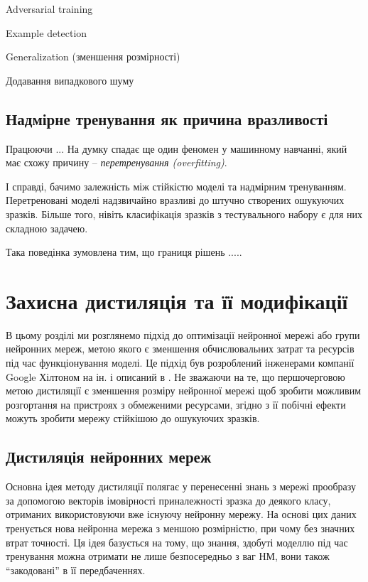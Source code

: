 \documentclass[14pt,a4paper]{extarticle}
\newcounter{e}
\numberwithin{equation}{section}
\numberwithin{figure}{section}
\begin{document}
 Adversarial training
 
 Example detection
 
 Generalization (зменшення розмірності)
 
 
 Додавання випадкового шуму
 
  
 \subsection{Надмірне тренування як причина вразливості}
 
 Працюючи ...
 На думку спадає ще один феномен у машинному навчанні, який має схожу причину -- \textit{перетренування (overfitting)}.
 
 І справді, бачимо залежність між стійкістю моделі та надмірним тренуванням. Перетреновані моделі надзвичайно вразливі до штучно створених ошукуючих зразків. Більше того, нівіть класифікація зразків з тестувального набору є для них складною задачею.
 
 Така поведінка зумовлена тим, що границя рішень .....
 
 
 
 \newpage
 \thispagestyle{empty}
 \section{Захисна дистиляція та її модифікації}
  В цьому розділі ми розглянемо підхід до оптимізації нейронної мережі або групи нейронних мереж, метою якого є зменшення обчислювальних затрат та ресурсів під час функціонування моделі. Це підхід був розроблений інженерами компанії Google Хілтоном на ін. і описаний в \cite{distillation}. Не зважаючи на те, що першочерговою метою дистиляції є зменшення розміру нейронної мережі щоб зробити можливим розгортання на пристроях з обмеженими ресурсами, згідно з \cite{defencive-distillation} її побічні ефекти можуть зробити мережу стійкішою до ошукуючих зразків.
 
 \subsection{Дистиляція нейронних мереж}
 
 Основна ідея методу дистиляції полягає у перенесенні знань з мережі прообразу за допомогою векторів імовірності приналежності зразка до деякого класу, отриманих використовуючи вже існуючу нейронну мережу. На основі цих даних тренується нова нейронна мережа з меншою розмірністю, при чому без значних втрат точності. Ця ідея базується на тому, що знання, здобуті моделлю під час тренування можна отримати не лише безпосередньо з ваг НМ, вони також ``закодовані'' в її передбаченнях.
 
\end{document}

